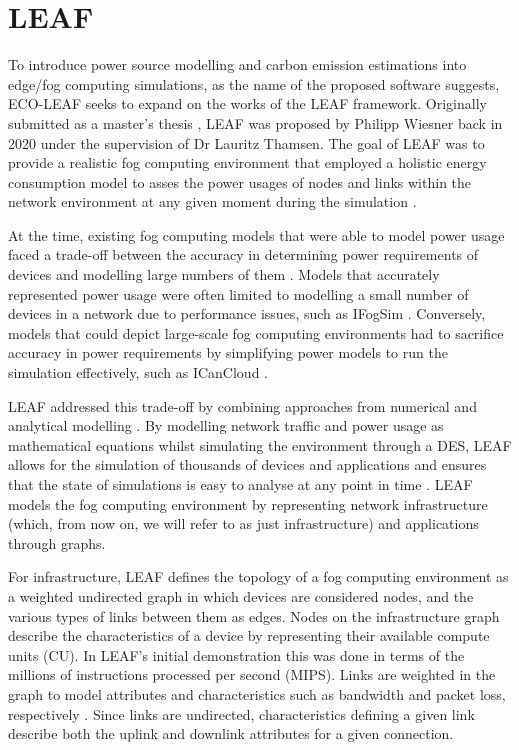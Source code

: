 \documentclass{l4proj}
\begin{document}
\section{LEAF}\label{leaf}
To introduce power source modelling and carbon emission estimations into edge/fog computing simulations, as the name of the proposed software suggests, ECO-LEAF seeks to expand on the works of the  LEAF framework.
Originally submitted as a master's thesis \citep{leafMasters}, LEAF was proposed by Philipp Wiesner back in 2020 under the supervision of Dr Lauritz Thamsen.
The goal of LEAF was to provide a realistic fog computing environment that employed a holistic energy consumption model to asses the power usages of nodes and links within the network environment at any given moment during the simulation \citep{leafMasters}.

At the time, existing fog computing models that were able to model power usage faced a trade-off between the accuracy in determining power requirements of devices and modelling large numbers of them \citep{leafMasters}.
Models that accurately represented power usage were often limited to modelling a small number of devices in a network due to performance issues, such as IFogSim \citep{IFOGSIM}.
Conversely, models that could depict large-scale fog computing environments had to sacrifice accuracy in power requirements by simplifying power models to run the simulation effectively, such as ICanCloud \citep{ICanCloud}.

LEAF addressed this trade-off by combining approaches from numerical and analytical modelling \citep{leafMasters}.
By modelling network traffic and power usage as mathematical equations whilst simulating the environment through a DES, LEAF allows for the simulation of thousands of devices and applications and ensures that the state of simulations is easy to analyse at any point in time \citep{leafMasters}.
LEAF models the fog computing environment by representing network infrastructure (which, from now on, we will refer to as just infrastructure) and applications through graphs.

For infrastructure, LEAF defines the topology of a fog computing environment as a weighted undirected graph in which devices are considered nodes, and the various types of links between them as edges.
Nodes on the infrastructure graph describe the characteristics of a device by representing their available compute units (CU).
In LEAF's initial demonstration this was done in terms of the millions of instructions processed per second (MIPS).
Links are weighted in the graph to model attributes and characteristics such as bandwidth and packet loss, respectively \citep{leaf2021}.
Since links are undirected, characteristics defining a given link describe both the uplink and downlink attributes for a given connection.
\end{document}
